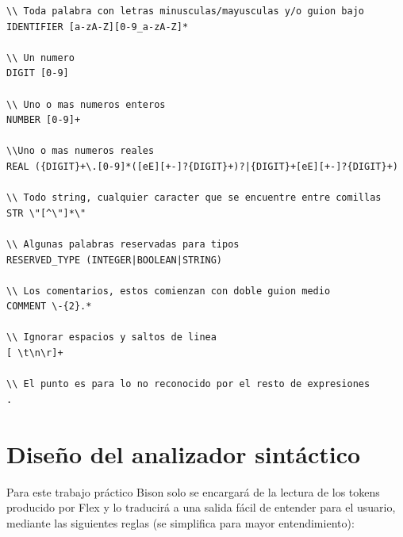 \documentclass[a4paper,12pt]{article}
\begin{document}
\begin{lstlisting}[style=myeiffel]
\\ Toda palabra con letras minusculas/mayusculas y/o guion bajo
IDENTIFIER [a-zA-Z][0-9_a-zA-Z]*  

\\ Un numero
DIGIT [0-9]

\\ Uno o mas numeros enteros
NUMBER [0-9]+

\\Uno o mas numeros reales
REAL ({DIGIT}+\.[0-9]*([eE][+-]?{DIGIT}+)?|{DIGIT}+[eE][+-]?{DIGIT}+)

\\ Todo string, cualquier caracter que se encuentre entre comillas
STR \"[^\"]*\"

\\ Algunas palabras reservadas para tipos
RESERVED_TYPE (INTEGER|BOOLEAN|STRING)

\\ Los comentarios, estos comienzan con doble guion medio
COMMENT \-{2}.*

\\ Ignorar espacios y saltos de linea
[ \t\n\r]+ 

\\ El punto es para lo no reconocido por el resto de expresiones
.
\end{lstlisting}

\newpage
\section{Diseño del analizador sintáctico}
\vspace{4mm}

Para este trabajo práctico Bison solo se encargará de la lectura de los tokens
producido por Flex y lo traducirá a una salida fácil de entender para el
usuario, mediante las siguientes reglas (se simplifica para mayor
entendimiento):
\end{document}
